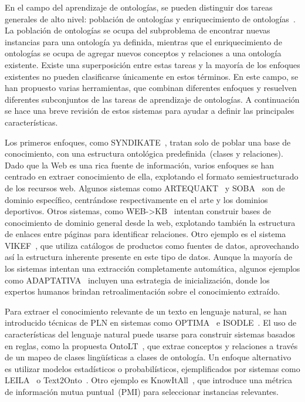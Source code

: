 En el campo del aprendizaje de ontologías, se pueden distinguir dos tareas generales de alto nivel: población de ontologías y enriquecimiento de ontologías~\cite{petasis2011ontology}.
La población de ontologías se ocupa del subproblema de encontrar nuevas instancias para una ontología ya definida, mientras que el enriquecimiento de ontologías se ocupa de agregar nuevos conceptos y relaciones a una ontología existente.
Existe una superposición entre estas tareas y la mayoría de los enfoques existentes no pueden clasificarse únicamente en estos términos.
En este campo, se han propuesto varias herramientas, que combinan diferentes enfoques y resuelven diferentes subconjuntos de las tareas de aprendizaje de ontologías.
A continuación se hace una breve revisión de estos sistemas para ayudar a definir las principales características.

Los primeros enfoques, como SYNDIKATE~\cite{syndikate}, tratan solo de poblar una base de conocimiento, con una estructura ontológica predefinida~(clases y relaciones).
Dado que la Web es una rica fuente de información, varios enfoques se han centrado en extraer conocimiento de ella, explotando el formato semiestructurado de los recursos web.
Algunos sistemas como ARTEQUAKT~\cite{artequakt} y SOBA~\cite{soba} son de dominio específico, centrándose respectivamente en el arte y los dominios deportivos.
Otros sistemas, como WEB->KB~\cite{webkb} intentan construir bases de conocimiento de dominio general desde la web, explotando también la estructura de enlaces entre páginas para identificar relaciones.
Otro ejemplo es el sistema VIKEF~\cite{vikef}, que utiliza catálogos de productos como fuentes de datos, aprovechando así la estructura inherente presente en este tipo de datos.
Aunque la mayoría de los sistemas intentan una extracción completamente automática, algunos ejemplos como ADAPTATIVA~\cite{adaptativa} incluyen una estrategia de inicialización, donde los expertos humanos brindan retroalimentación sobre el conocimiento extraído.

Para extraer el conocimiento relevante de un texto en lenguaje natural, se han introducido técnicas de PLN en sistemas como OPTIMA~\cite{optima} e ISODLE~\cite{isolde}.
El uso de características del lenguaje natural puede usarse para construir sistemas basados en reglas, como la propuesta OntoLT~\cite{buitelaar2004ontolt}, que extrae conceptos y relaciones a través de un mapeo de clases lingüísticas a clases de ontología.
Un enfoque alternativo es utilizar modelos estadísticos o probabilísticos, ejemplificados por sistemas como LEILA~\cite{leila} o Text2Onto~\cite{cimiano2005text2onto}.
Otro ejemplo es KnowItAll~\cite{knowitall}, que introduce una métrica de información mutua puntual~(PMI) para seleccionar instancias relevantes.

